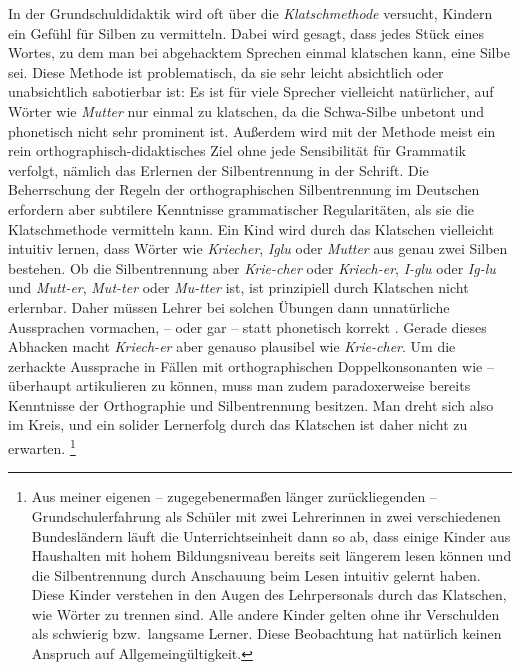 
In der Grundschuldidaktik wird oft über die \textit{Klatschmethode} versucht, Kindern ein Gefühl für Silben zu vermitteln.
Dabei wird gesagt, dass jedes Stück eines Wortes, zu dem man bei abgehacktem Sprechen einmal klatschen kann, eine Silbe sei.
Diese Methode ist problematisch, da sie sehr leicht absichtlich oder unabsichtlich sabotierbar ist:
Es ist für viele Sprecher vielleicht natürlicher, auf Wörter wie \textit{Mutter} \textipa{[mUt5]} nur einmal zu klatschen, da die Schwa-Silbe unbetont und phonetisch nicht sehr prominent ist.
Außerdem wird mit der Methode meist ein rein orthographisch-didaktisches Ziel ohne jede Sensibilität für Grammatik verfolgt, nämlich das Erlernen der Silbentrennung in der Schrift.
Die Beherrschung der Regeln der orthographischen Silbentrennung im Deutschen erfordern aber subtilere Kenntnisse grammatischer Regularitäten, als sie die Klatschmethode vermitteln kann.
Ein Kind wird durch das Klatschen vielleicht intuitiv lernen, dass Wörter wie \textit{Kriecher}, \textit{Iglu} oder \textit{Mutter} aus genau zwei Silben bestehen.
Ob die Silbentrennung aber \textit{Krie-cher} oder \textit{Kriech-er}, \textit{I-glu} oder \textit{Ig-lu} und \textit{Mutt-er}, \textit{Mut-ter} oder \textit{Mu-tter} ist, ist prinzipiell durch Klatschen nicht erlernbar.
Daher müssen Lehrer bei solchen Übungen dann unnatürliche Aussprachen vormachen, \zB \textipa{[mUt]} -- \textipa{[ta]} oder gar \textipa{[mUt]} -- \textipa{[tEK]} statt phonetisch korrekt \textipa{[mU.t5]}.
Gerade dieses Abhacken macht \textit{Kriech-er} aber genauso plausibel wie \textit{Krie-cher}.
Um die zerhackte Aussprache in Fällen mit orthographischen Doppelkonsonanten wie \textipa{[mUt]} -- \textipa{[ta]} überhaupt artikulieren zu können, muss man zudem paradoxerweise bereits Kenntnisse der Orthographie und Silbentrennung besitzen.
Man dreht sich also im Kreis, und ein solider Lernerfolg durch das Klatschen ist daher nicht zu erwarten.%
\footnote{Aus meiner eigenen -- zugegebenermaßen länger zurückliegenden -- Grundschulerfahrung als Schüler mit zwei Lehrerinnen in zwei verschiedenen Bundesländern läuft die Unterrichtseinheit dann so ab, dass einige Kinder aus Haushalten mit hohem Bildungsniveau bereits seit längerem lesen können und die Silbentrennung durch Anschauung beim Lesen intuitiv gelernt haben.
Diese Kinder verstehen in den Augen des Lehrpersonals durch das Klatschen, wie Wörter zu trennen sind.
Alle andere Kinder gelten ohne ihr Verschulden als schwierig bzw.\ langsame Lerner.
Diese Beobachtung hat natürlich keinen Anspruch auf Allgemeingültigkeit.}

